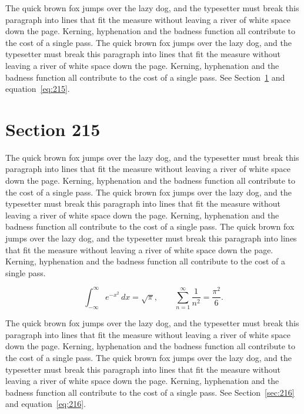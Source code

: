 \documentclass{article}
\begin{document}
The quick brown fox jumps over the lazy dog, and the typesetter must break this paragraph into lines that fit the measure without leaving a river of white space down the page. Kerning, hyphenation and the badness function all contribute to the cost of a single pass. The quick brown fox jumps over the lazy dog, and the typesetter must break this paragraph into lines that fit the measure without leaving a river of white space down the page. Kerning, hyphenation and the badness function all contribute to the cost of a single pass. 
See Section~\ref{sec:215} and equation~\eqref{eq:215}.
\section{Section 215}
\label{sec:215}
The quick brown fox jumps over the lazy dog, and the typesetter must break this paragraph into lines that fit the measure without leaving a river of white space down the page. Kerning, hyphenation and the badness function all contribute to the cost of a single pass. The quick brown fox jumps over the lazy dog, and the typesetter must break this paragraph into lines that fit the measure without leaving a river of white space down the page. Kerning, hyphenation and the badness function all contribute to the cost of a single pass. The quick brown fox jumps over the lazy dog, and the typesetter must break this paragraph into lines that fit the measure without leaving a river of white space down the page. Kerning, hyphenation and the badness function all contribute to the cost of a single pass. 

\begin{equation}\label{eq:215}
\int_{-\infty}^{\infty} e^{-x^{2}}\,dx = \sqrt{\pi}, \qquad
\sum_{n=1}^{\infty} \frac{1}{n^{2}} = \frac{\pi^{2}}{6}.
\end{equation}

The quick brown fox jumps over the lazy dog, and the typesetter must break this paragraph into lines that fit the measure without leaving a river of white space down the page. Kerning, hyphenation and the badness function all contribute to the cost of a single pass. The quick brown fox jumps over the lazy dog, and the typesetter must break this paragraph into lines that fit the measure without leaving a river of white space down the page. Kerning, hyphenation and the badness function all contribute to the cost of a single pass. 
See Section~\ref{sec:216} and equation~\eqref{eq:216}.
\end{document}
